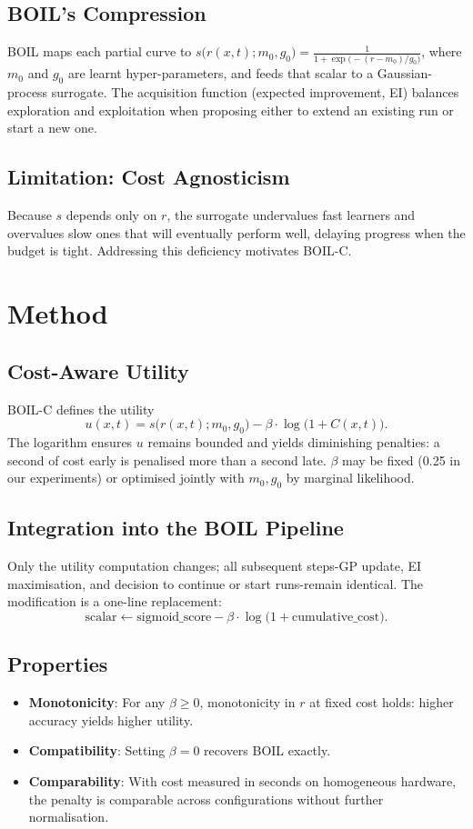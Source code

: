 \documentclass{article} %
\begin{document}
\subsection{BOIL's Compression}
BOIL maps each partial curve to \(s\big(r(x,t); m_0, g_0\big) = \frac{1}{1 + \exp\big(- (r - m_0)/g_0\big)}\), where \(m_0\) and \(g_0\) are learnt hyper-parameters, and feeds that scalar to a Gaussian-process surrogate. The acquisition function (expected improvement, EI) balances exploration and exploitation when proposing either to extend an existing run or start a new one.

\subsection{Limitation: Cost Agnosticism}
Because \(s\) depends only on \(r\), the surrogate undervalues fast learners and overvalues slow ones that will eventually perform well, delaying progress when the budget is tight. Addressing this deficiency motivates BOIL-C.

\section{Method}
\label{sec:method}
\subsection{Cost-Aware Utility}
BOIL-C defines the utility
\[
  u(x,t) = s\big(r(x,t); m_0, g_0\big) - \beta\cdot \log\big(1 + C(x,t)\big).
\]
The logarithm ensures \(u\) remains bounded and yields diminishing penalties: a second of cost early is penalised more than a second late. \(\beta\) may be fixed (0.25 in our experiments) or optimised jointly with \(m_0, g_0\) by marginal likelihood.

\subsection{Integration into the BOIL Pipeline}
Only the utility computation changes; all subsequent steps-GP update, EI maximisation, and decision to continue or start runs-remain identical. The modification is a one-line replacement:
\[
  \text{scalar} \leftarrow \text{sigmoid\_score} - \beta\cdot \log\big(1 + \text{cumulative\_cost}\big).
\]

\subsection{Properties}
\begin{itemize}
  \item \textbf{Monotonicity}: For any \(\beta \ge 0\), monotonicity in \(r\) at fixed cost holds: higher accuracy yields higher utility.
  \item \textbf{Compatibility}: Setting \(\beta=0\) recovers BOIL exactly.
  \item \textbf{Comparability}: With cost measured in seconds on homogeneous hardware, the penalty is comparable across configurations without further normalisation.
\end{itemize}
\end{document}
